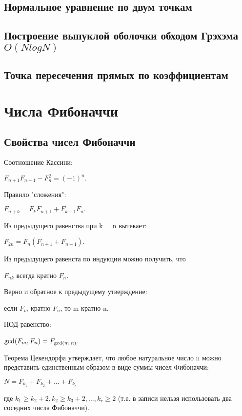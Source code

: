 \documentclass[a4paper]{article}
\begin{document}
\begin{multicols*}{2}
		 \subsection{Нормальное уравнение по двум точкам}
		 	
		 \subsection{Построение выпуклой оболочки обходом Грэхэма $O (N log N)$}
		 
		 \subsection{Точка пересечения прямых по коэффициентам}
		 
		 
		 \section{Числа Фибоначчи}		 
		 \subsection{Свойства чисел Фибоначчи}
		 
		 Соотношение Кассини:
		 
		 $F_{n+1} F_{n-1} - F_n^2 = (-1)^n.$
		 
		 Правило "сложения":
		 
		 $F_{n+k} = F_k F_{n+1} + F_{k-1} F_n.$ 
		 
		 Из предыдущего равенства при k = n вытекает:
		 
		 $F_{2n} = F_n (F_{n+1} + F_{n-1}).$ 
		 
		 Из предыдущего равенста по индукции можно получить, что
		 
		 $F_{nk}$ всегда кратно $F_n$.
		 
		 Верно и обратное к предыдущему утверждение:
		 
		 если $F_m$ кратно $F_n$, то m кратно n.
		 
		 НОД-равенство:
		 
		 ${\rm gcd} (F_m, F_n) = F_{{\rm gcd} (m, n)}$. 
		 
		 Теорема Цекендорфа утверждает, что любое натуральное число n можно представить единственным образом в виде суммы чисел Фибоначчи:
		 
		 $N = F_{k_1} + F_{k_2} + \ldots + F_{k_r}$
		 
		 где $k_1 \ge k_2+2, k_2 \ge k_3+2, \ldots, k_r \ge 2$ (т.е. в записи нельзя использовать два соседних числа Фибоначчи).
		 

\end{multicols*}
\end{document}
